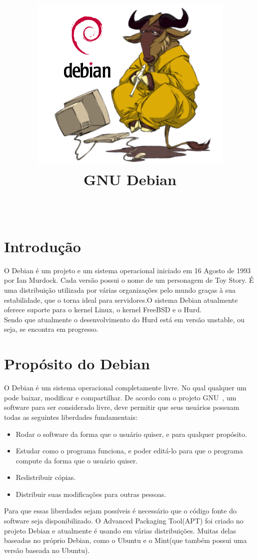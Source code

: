 \documentclass[conference]{IEEEtran}
\title{\includegraphics[scale = 0.2,trim = 0 0 0 0,clip = true]{GnuDebian.png}\\
	GNU Debian}
\author{	
\IEEEauthorblockN{Francisco Anderson Bezerra Rodrigues, Marcelo Bulhões Fonseca, Vitor Silva De Deus} \\
\IEEEauthorblockA{Departamento de Ciência da Computação, \\ Universidade de Brasília\\
}
}
\begin{document}
 

\maketitle
{}  




\section{Introdução}\label{sec:intro}
O Debian é um projeto e um sistema operacional iniciado em 16 Agosto de 1993 por Ian Murdock\cite{DebianHistory}. Cada versão possui o nome de um personagem de Toy Story. É uma distribuição utilizada por várias organizações pelo mundo\cite{DebianUsers} graças à sua estabilidade, que o torna ideal para servidores.O sistema Debian atualmente oferece suporte para o kernel Linux, o kernel FreeBSD e o Hurd.\\

 Sendo que atualmente o desenvolvimento do Hurd está em versão unstable, ou seja, se encontra em progresso. 

\section{Propósito do Debian}\label{sec:prop}
O Debian é um sistema operacional completamente livre. No qual qualquer um pode baixar, modificar e compartilhar. De acordo com o projeto GNU~\cite{FreeSoftware}, um software para ser considerado livre, deve permitir que seus usuários possuam todas as seguintes liberdades fundamentais:
\begin{itemize}
	\item Rodar o software da forma que o usuário quiser, e para qualquer propósito.
	\item Estudar como o programa funciona, e poder editá-lo para que o programa compute da forma que o usuário quiser.
	\item Redistribuir cópias.
	\item Distribuir suas modificações para outras pessoas.
\end{itemize}

Para que essas liberdades sejam possíveis é necessário que o código fonte do software seja disponibilizado. O Advanced Packaging Tool(APT) foi criado no projeto Debian e atualmente é usando em várias distribuições. Muitas delas baseadas no próprio Debian, como o Ubuntu e o Mint(que também possui uma versão baseada no Ubuntu).
\end{document}
